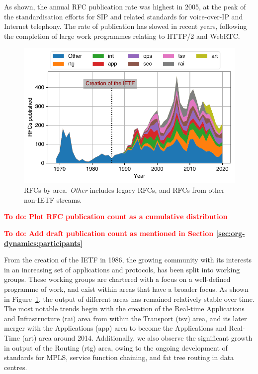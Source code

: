 \documentclass[twocolumn,10pt]{article}
\newlength{\figureWidthOneColumn}
\newcommand{\todo}[1]{\textbf{\textcolor{red}{To do: #1}}}
\newcommand{\pb}[1]{\vspace{0.75ex}\noindent{\textbf{#1}}}
\begin{document}
As shown, the annual RFC publication rate was highest in 2005, at the peak
of the standardisation efforts for SIP and related standards for voice-over-IP
and Internet telephony. The rate of publication has slowed in recent years,
following the completion of large work programmes relating to HTTP/2 and
WebRTC.

\begin{figure}
  \centering
  \includegraphics[width=\figureWidthOneColumn]{figures-prev/imc-2021/documents/rfcs_areas.pdf}
  \caption{
    RFCs by area. \textit{Other} includes legacy RFCs, and RFCs from other
    non-IETF streams.
  }
  \label{fig:rfcs_by_area}
\end{figure}

\todo{Plot RFC publication count as a cumulative distribution}

\todo{Add draft publication count as mentioned in Section \ref{sec:org-dynamics:participants}}

\pb{Role of Working Groups:}
From the creation of the IETF in 1986, the growing community with its
interests in an increasing set of applications and protocols, has been
split into working groups. These working groups are chartered with a focus
on a well-defined programme of work, and exist within areas that have a
broader focus.  As shown in Figure~\ref{fig:rfcs_by_area}, the output of
different areas has remained relatively stable over time. The most notable
trends begin with the creation of the Real-time Applications and
Infrastructure (rai) area from within the Transport (tsv) area, and its
later merger with the Applications (app) area to become the Applications
and Real-Time (art) area around 2014. Additionally, we also observe the
significant growth in output of the Routing (rtg) area, owing to the
ongoing development of standards for MPLS, service function chaining, and
fat tree routing in data centres.
\end{document}
